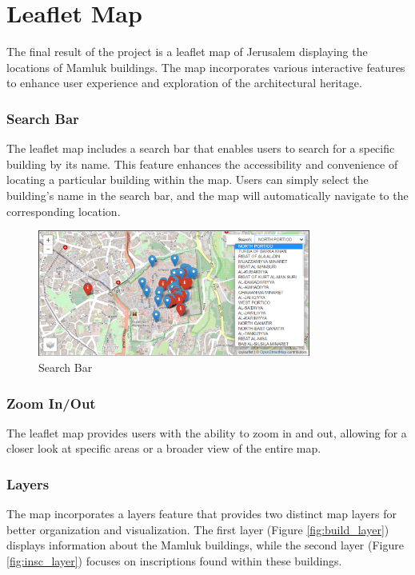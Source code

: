 \section{Leaflet Map}

The final result of the project is a leaflet map of Jerusalem displaying the locations of Mamluk buildings. The map incorporates various interactive features to enhance user experience and exploration of the architectural heritage.

\subsubsection{Search Bar}

The leaflet map includes a search bar that enables users to search for a specific building by its name. This feature enhances the accessibility and convenience of locating a particular building within the map. Users can simply select the building's name in the search bar, and the map will automatically navigate to the corresponding location.

\begin{figure}[H]
\centering
\includegraphics[width=0.8\textwidth]{Images/search_bar.png}
\caption{Search Bar}
\label{fig:search_bar}
\end{figure}

\subsubsection{Zoom In/Out}

The leaflet map provides users with the ability to zoom in and out, allowing for a closer look at specific areas or a broader view of the entire map.

\subsubsection{Layers}

The map incorporates a layers feature that provides two distinct map layers for better organization and visualization. The first layer (Figure \ref{fig:build_layer}) displays information about the Mamluk buildings, while the second layer (Figure \ref{fig:insc_layer}) focuses on inscriptions found within these buildings. \\[0.3cm]

